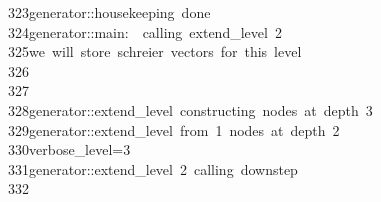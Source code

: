 \begin{tabbing}
323\>generator::housekeeping\ done\\[0pt]
324\>generator::main:\ \ calling\ extend\_level\ 2\\[0pt]
325\>we\ will\ store\ schreier\ vectors\ for\ this\ level\\[0pt]
326\>\\[0pt]
327\>\\[0pt]
328\>generator::extend\_level\ constructing\ nodes\ at\ depth\ 3\\[0pt]
329\>generator::extend\_level\ from\ 1\ nodes\ at\ depth\ 2\\[0pt]
330\>verbose\_level=3\\[0pt]
331\>generator::extend\_level\ 2\ calling\ downstep\\[0pt]
332\>\\[0pt]

\end{tabbing}
